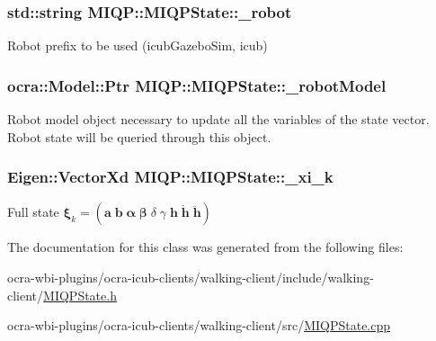 \hypertarget{classMIQP_1_1MIQPState_ad27b574f93e1b163ff9b01939bd00de3}{
\subsubsection[{\-\_\-robot}]{\setlength{\rightskip}{0pt plus 5cm}std\-::string {\bf \-M\-I\-Q\-P\-::\-M\-I\-Q\-P\-State\-::\-\_\-robot}}}\label{classMIQP_1_1MIQPState_ad27b574f93e1b163ff9b01939bd00de3}
\-Robot prefix to be used (icub\-Gazebo\-Sim, icub) \hypertarget{classMIQP_1_1MIQPState_ab4a5a930c7db84035376864938d8a170}{
\subsubsection[{\-\_\-robot\-Model}]{\setlength{\rightskip}{0pt plus 5cm}ocra\-::\-Model\-::\-Ptr {\bf \-M\-I\-Q\-P\-::\-M\-I\-Q\-P\-State\-::\-\_\-robot\-Model}}}\label{classMIQP_1_1MIQPState_ab4a5a930c7db84035376864938d8a170}
\-Robot model object necessary to update all the variables of the state vector. \-Robot state will be queried through this object. \hypertarget{classMIQP_1_1MIQPState_aee08863bacb44f7c667cbd566fa6ddcf}{
\subsubsection[{\-\_\-xi\-\_\-k}]{\setlength{\rightskip}{0pt plus 5cm}\-Eigen\-::\-Vector\-Xd {\bf \-M\-I\-Q\-P\-::\-M\-I\-Q\-P\-State\-::\-\_\-xi\-\_\-k}}}\label{classMIQP_1_1MIQPState_aee08863bacb44f7c667cbd566fa6ddcf}
\-Full state $\mathbf{\xi}_k = (\mathbf{a} \; \mathbf{b} \; \mathbf{\alpha} \; \mathbf{\beta} \; \delta \; \gamma \; \mathbf{h} \; \mathbf{\dot{h}} \; \mathbf{\ddot{h}} )$ 

\-The documentation for this class was generated from the following files\-:\begin{DoxyCompactItemize}
\item 
ocra-\/wbi-\/plugins/ocra-\/icub-\/clients/walking-\/client/include/walking-\/client/\hyperlink{MIQPState_8h}{\-M\-I\-Q\-P\-State.\-h}\item 
ocra-\/wbi-\/plugins/ocra-\/icub-\/clients/walking-\/client/src/\hyperlink{MIQPState_8cpp}{\-M\-I\-Q\-P\-State.\-cpp}\end{DoxyCompactItemize}
